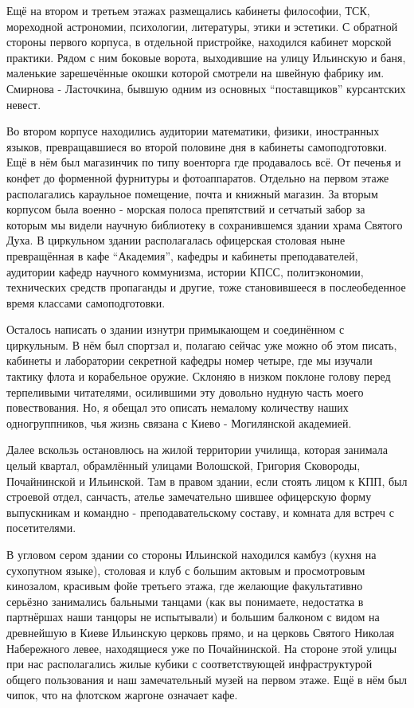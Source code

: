 Ещё на втором и третьем этажах размещались кабинеты философии, ТСК, мореходной
астрономии, психологии, литературы, этики и эстетики. С обратной стороны
первого корпуса, в отдельной пристройке, находился кабинет морской практики.
Рядом с ним боковые ворота, выходившие на улицу Ильинскую и баня, маленькие
зарешечённые окошки которой смотрели на швейную фабрику им. Смирнова -
Ласточкина, бывшую одним из основных \enquote{поставщиков} курсантских невест. 

Во втором корпусе находились аудитории математики, физики, иностранных языков,
превращавшиеся во второй половине дня в кабинеты самоподготовки. Ещё в нём был
магазинчик по типу военторга где продавалось всё. От печенья и конфет до
форменной фурнитуры и фотоаппаратов. Отдельно на первом этаже располагались
караульное помещение, почта и книжный магазин. За вторым корпусом была военно -
морская полоса препятствий и сетчатый забор за которым мы видели научную
библиотеку в сохранившемся здании храма Святого Духа. В циркульном здании
располагалась офицерская столовая ныне превращённая в кафе \enquote{Академия}, кафедры
и кабинеты преподавателей, аудитории кафедр научного коммунизма, истории КПСС,
политэкономии, технических средств пропаганды и другие, тоже становившееся в
послеобеденное время классами самоподготовки. 

Осталось написать о здании
изнутри примыкающем и соединённом с циркульным. В нём был спортзал и, полагаю
сейчас уже можно об этом писать, кабинеты и лаборатории секретной кафедры номер
четыре, где мы изучали тактику флота и корабельное оружие. Склоняю в низком
поклоне голову перед терпеливыми читателями, осилившими эту довольно нудную
часть моего повествования. Но, я обещал это описать немалому количеству наших
одногруппников, чья жизнь связана с Киево  -  Могилянской академией. 

Далее вскользь остановлюсь на жилой территории училища, которая занимала целый
квартал, обрамлённый улицами Волошской, Григория Сковороды, Почайнинской и
Ильинской. Там в правом здании, если стоять лицом к КПП, был строевой отдел,
санчасть, ателье замечательно шившее офицерскую форму выпускникам и командно -
преподавательскому составу, и комната для встреч с посетителями. 

В угловом сером здании со стороны Ильинской находился камбуз (кухня на
сухопутном языке), столовая и клуб с большим актовым и просмотровым кинозалом,
красивым фойе третьего этажа, где желающие факультативно серьёзно занимались
бальными танцами (как вы понимаете, недостатка в партнёршах наши танцоры не
испытывали) и большим балконом с видом на древнейшую в Киеве Ильинскую церковь
прямо, и на церковь Святого Николая Набережного левее, находящиеся уже по
Почайнинской. На стороне этой улицы при нас располагались жилые кубики с
соответствующей инфраструктурой общего пользования и наш замечательный музей на
первом этаже.  Ещё в нём был чипок, что на флотском жаргоне означает кафе. 

